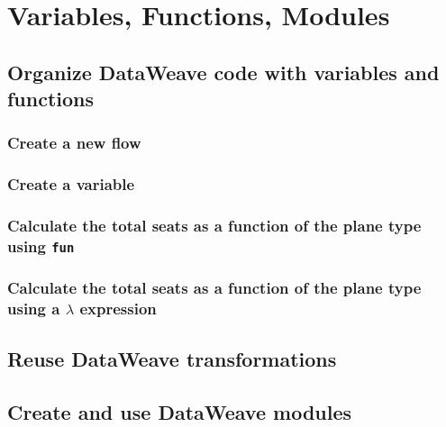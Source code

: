 \chapter{Variables, Functions, Modules}

\section{Organize DataWeave code with variables and functions}

\subsection{Create a new flow}

\subsection{Create a variable}

\subsection{Calculate the total seats as a function of the plane type using \texttt{fun}}

\subsection{Calculate the total seats as a function of the plane type using a $\lambda$ expression}

\section{Reuse DataWeave transformations}



\section{Create and use DataWeave modules}

